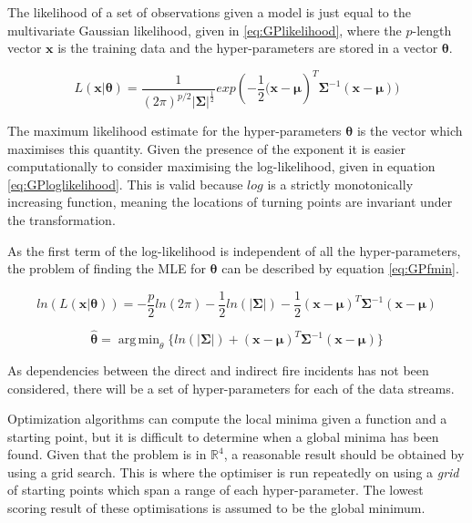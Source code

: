 \documentclass[a4paper,11pt]{report}
\DeclareMathOperator*{\argmin}{arg\,min}
\begin{document}
The likelihood of a set of observations given a model is just equal to the multivariate Gaussian likelihood, given in \ref{eq:GPlikelihood}, where the \(p\)-length vector \(\mathbf{x}\) is the training data and the hyper-parameters are stored in a vector \(\mathbf{\theta}\).

\begin{equation} \label{eq:GPlikelihood}
L(\mathbf{x | \theta}) = \frac{1}{(2\pi)^{p/2} |\boldsymbol{\Sigma|}^{\frac{1}{2}}} exp(- \frac{1}{2} \mathbf{(x}-\boldsymbol{\mu})^{T}\boldsymbol{\Sigma}^{-1}(\mathbf{x}-\boldsymbol{\mu}))
\end{equation}

The maximum likelihood estimate for the hyper-parameters \(\mathbf{\theta}\) is the vector which maximises this quantity. Given the presence of the exponent it is easier computationally to consider maximising the log-likelihood, given in equation \ref{eq:GPloglikelihood}. This is valid because \(log\) is a strictly monotonically increasing function, meaning the locations of turning points are invariant under the transformation. \par
As the first term of the log-likelihood is independent of all the hyper-parameters, the problem of finding the MLE for \(\boldsymbol{\theta}\) can be described by equation \ref{eq:GPfmin}.

\singlespacing

\begin{equation} \label{eq:GPloglikelihood}
ln(L(\mathbf{x} | \boldsymbol{\theta})) = - \frac{p}{2} ln(2\pi) - \frac{1}{2} ln(|\boldsymbol{\Sigma}|) - \frac{1}{2} (\mathbf{x}-\boldsymbol{\mu})^{T} \boldsymbol{\Sigma}^{-1}(\mathbf{x}-\boldsymbol{\mu})
\end{equation}

\begin{equation} \label{eq:GPfmin}
\hat{\boldsymbol{\theta}} = \argmin_\theta{\{ln(|\boldsymbol{\Sigma}|) +(\mathbf{x}-\boldsymbol{\mu})^{T}\boldsymbol{\Sigma}^{-1}(\mathbf{x}-\boldsymbol{\mu})}\}
\end{equation}

\doublespacing

As dependencies between the direct and indirect fire incidents has not been considered, there will be a set of hyper-parameters for each of the data streams. \par
Optimization algorithms can compute the local minima given a function and a starting point, but it is difficult to determine when a global minima has been found. Given that the problem is in \(\mathds{R}^4\), a reasonable result should be obtained by using a grid search. This is where the optimiser is run repeatedly on using a \textit{grid} of starting points which span a range of each hyper-parameter. The lowest scoring result of these optimisations is assumed to be the global minimum. \par
\end{document}
